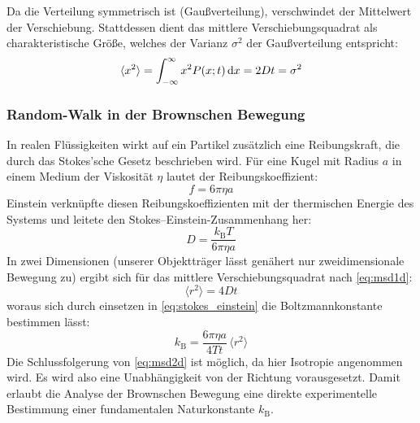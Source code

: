 Da die Verteilung symmetrisch ist (Gaußverteilung), verschwindet der Mittelwert der Verschiebung. Stattdessen dient das mittlere Verschiebungsquadrat als charakteristische Größe, welches der Varianz \(\sigma^2\) der Gaußverteilung entspricht: 
\begin{equation} \label{eq:msd1d}
    \langle x^{2} \rangle = \int_{-\infty}^\infty x^2 P(x;t)\mathop{}\!\mathrm{d} x =  2 D t = \sigma^2
\end{equation}

\subsubsection{Random-Walk in der Brownschen Bewegung} \label{ssec:RndWalkPhys}
In realen Flüssigkeiten wirkt auf ein Partikel zusätzlich eine Reibungskraft, die durch das Stokes’sche Gesetz beschrieben wird. Für eine Kugel mit Radius \(a\) in einem Medium der Viskosität \(\eta\) lautet der Reibungskoeffizient:
\begin{equation} \label{eq:stokes}
    f = 6\pi \eta a
\end{equation}
Einstein verknüpfte diesen Reibungskoeffizienten mit der thermischen Energie des Systems und leitete den Stokes–Einstein-Zusammenhang her:
\begin{equation} \label{eq:stokes_einstein}
    D = \frac{k_{\mathrm{B}} T}{6\pi \eta a}
\end{equation}
In zwei Dimensionen (unserer Objektträger lässt genähert nur zweidimensionale Bewegung zu) ergibt sich für das mittlere Verschiebungsquadrat nach \cref{eq:msd1d}:
\begin{equation} \label{eq:msd2d}
    \langle r^{2} \rangle = 4 D t
\end{equation}
woraus sich durch einsetzen in \cref{eq:stokes_einstein} die Boltzmannkonstante bestimmen lässt:
\begin{equation} \label{eq:kfrommsd}
    k_{\mathrm{B}} = \frac{6\pi \eta a}{4 T t}\,\langle r^{2} \rangle
\end{equation}
Die Schlussfolgerung von \cref{eq:msd2d} ist möglich, da hier Isotropie angenommen wird. Es wird also eine Unabhängigkeit von der Richtung vorausgesetzt. Damit erlaubt die Analyse der Brownschen Bewegung eine direkte experimentelle Bestimmung einer fundamentalen Naturkonstante \(k_{\mathrm{B}}\).




